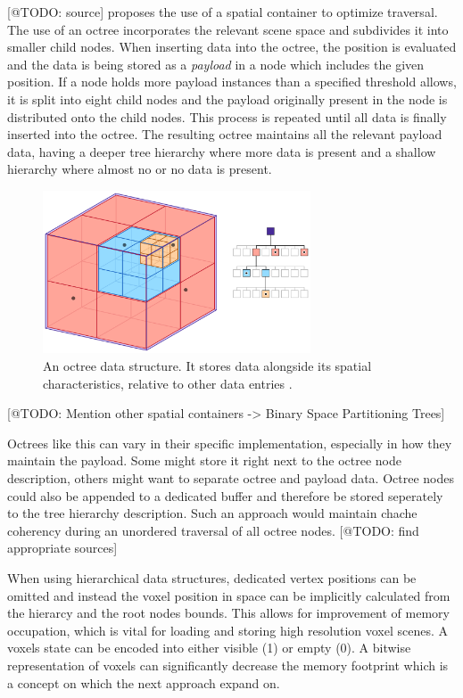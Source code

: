[@TODO: source] proposes the use of a spatial container to optimize traversal. The use of an octree 
incorporates the relevant scene space and subdivides it into smaller child nodes. When inserting data 
into the octree, the position is evaluated and the data is being stored as a \emph{payload} in 
a node which includes the given position. If a node holds more payload instances than a specified threshold 
allows, it is split into eight child nodes and the payload originally present in the node is 
distributed onto the child nodes. This process is repeated until all data is finally inserted 
into the octree. The resulting octree maintains all the relevant payload data, having a deeper tree 
hierarchy where more data is present and a shallow hierarchy where almost no or no data is present.

\begin{figure}[h]
    \centering
    \includegraphics[width=300px]{images/graphics/octree.png}
    \caption{An octree data structure. It stores data alongside its spatial characteristics, relative to 
    other data entries \cite{Six2021}.}
    \label{fig:octree}
\end{figure}

[@TODO: Mention other spatial containers -> Binary Space Partitioning Trees]

Octrees like this can vary in their specific implementation, especially in how they maintain the 
payload. Some might store it right next to the octree node description, others might want to separate 
octree and payload data. Octree nodes could also be appended to a dedicated buffer and therefore be stored 
seperately to the tree hierarchy description. Such an approach would maintain chache coherency during an 
unordered traversal of all octree nodes. [@TODO: find appropriate sources]

When using hierarchical data structures, dedicated vertex positions can be omitted and instead 
the voxel position in space can be implicitly calculated from the hierarcy and the root nodes bounds. 
This allows for improvement of memory occupation, which is vital for loading and storing high 
resolution voxel scenes. A voxels state can be encoded into either visible (1) or empty (0).
A bitwise representation of voxels can significantly decrease the memory footprint which is a concept 
on which the next approach expand on.

